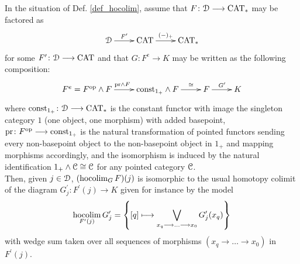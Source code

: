     \begin{lem}\label{lem_hocolim_name_justification}
      In the situation of Def. \ref{def_hocolim}, assume that $F \colon \mathcal{D} \longrightarrow
      \mathrm{CAT}_*$ may be factored as
      \begin{displaymath}
        \xymatrix{
          \cD \ar[r]^-{F^\prime} &
          \CAT \ar[r]^-{(-)_+} &
          \CAT_*
        }
      \end{displaymath}
      for some $F^\prime \colon \mathcal{D} \longrightarrow \mathrm{CAT}$ and that $G \colon F^e \to K$ may
      be written as the following composition:
      \begin{displaymath}
        \xymatrix{
          F^e = F^{\op} \wedge F \ar[r]^{\mathrm{pr} \wedge F} &
          \mathrm{const}_{1_+} \wedge F \ar[r]^-{\cong} &
          F \ar[r]^{G^\prime} &
          K
        }
      \end{displaymath}
      where $\mathrm{const}_{1_+} \colon \mathcal{D} \longrightarrow \mathrm{CAT}_*$ is the constant functor with
      image the singleton category $1$ (one object, one morphism) with added
      basepoint, $\mathrm{pr} \colon F^{\mathrm{op}} \longrightarrow \mathrm{const}_{1_+}$ is the
      natural transformation of pointed functors sending every non-basepoint
      object to the non-basepoint object in $1_+$ and mapping morphisms
      accordingly, and the isomorphism is induced by the natural identification
      $1_+ \wedge \mathcal{C} \cong \mathcal{C}$ for any pointed category $\mathcal{C}$.\\
      Then, given $j \in \mathcal{D}$, $(\operatorname*{hocolim}_G F)(j)$ is isomorphic to the usual
      homotopy colimit of the diagram $G^\prime_j \colon F^\prime(j) \to K$
      given for instance by the model
      \begin{displaymath}
        \operatorname*{hocolim}_{F^\prime(j)} G_j^\prime = \left\{ 
          [q] \longmapsto \bigvee_{x_q \longrightarrow \ldots \longrightarrow x_0} G_j^\prime(x_q)
        \right\}
      \end{displaymath}
      with wedge sum taken over all sequences of morphisms $(x_q \to \ldots \to
      x_0)$ in $F^\prime(j)$.
    \end{lem}
